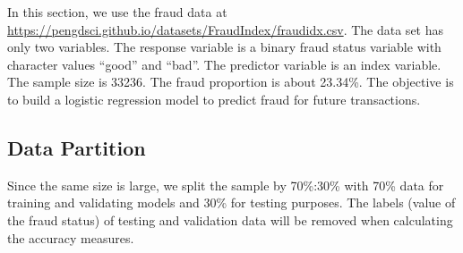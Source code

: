 \documentclass[
]{book}
\newenvironment{Shaded}{\begin{snugshade}}{\end{snugshade}}
\newcommand{\AttributeTok}[1]{\textcolor[rgb]{0.13,0.29,0.53}{#1}}
\newcommand{\ConstantTok}[1]{\textcolor[rgb]{0.56,0.35,0.01}{#1}}
\newcommand{\DecValTok}[1]{\textcolor[rgb]{0.00,0.00,0.81}{#1}}
\newcommand{\DocumentationTok}[1]{\textcolor[rgb]{0.56,0.35,0.01}{\textbf{\textit{#1}}}}
\newcommand{\FloatTok}[1]{\textcolor[rgb]{0.00,0.00,0.81}{#1}}
\newcommand{\FunctionTok}[1]{\textcolor[rgb]{0.13,0.29,0.53}{\textbf{#1}}}
\newcommand{\NormalTok}[1]{#1}
\newcommand{\OtherTok}[1]{\textcolor[rgb]{0.56,0.35,0.01}{#1}}
\newcommand{\SpecialCharTok}[1]{\textcolor[rgb]{0.81,0.36,0.00}{\textbf{#1}}}
\newcommand{\StringTok}[1]{\textcolor[rgb]{0.31,0.60,0.02}{#1}}
\begin{document}
In this section, we use the fraud data at \url{https://pengdsci.github.io/datasets/FraudIndex/fraudidx.csv}. The data set has only two variables. The response variable is a binary fraud status variable with character values ``good'' and ``bad''. The predictor variable is an index variable. The sample size is 33236. The fraud proportion is about 23.34\%. The objective is to build a logistic regression model to predict fraud for future transactions.

\hypertarget{data-partition}{%
\subsection{Data Partition}\label{data-partition}}

Since the same size is large, we split the sample by 70\%:30\% with 70\% data for training and validating models and 30\% for testing purposes. The labels (value of the fraud status) of testing and validation data will be removed when calculating the accuracy measures.

\begin{Shaded}
\end{Shaded}
\end{document}
